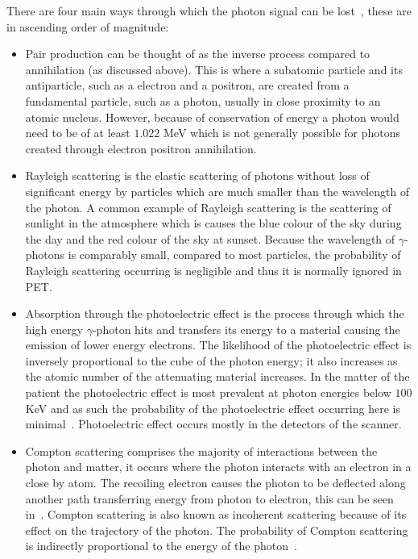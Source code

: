                There are four main ways through which the photon signal can be lost~, these are in ascending order of magnitude:
                
                \begin{itemize}
                    \item Pair production can be thought of as the inverse process compared to annihilation (as discussed above). This is where a subatomic particle and its antiparticle, such as a electron and a positron, are created from a fundamental particle, such as a photon, usually in close proximity to an atomic nucleus. However, because of conservation of energy a photon would need to be of at least $1.022$ \gls{MeV} which is not generally possible for photons created through electron positron annihilation.
                    
                    \item Rayleigh scattering is the elastic scattering of photons without loss of significant energy by particles which are much smaller than the wavelength of the photon. A common example of Rayleigh scattering is the scattering of sunlight in the atmosphere which is causes the blue colour of the sky during the day and the red colour of the sky at sunset. Because the wavelength of $\gamma$-photons is comparably small, compared to most particles, the probability of Rayleigh scattering occurring is negligible and thus it is normally ignored in \gls{PET}.
                    
                    \item Absorption through the photoelectric effect is the process through which the high energy $\gamma$-photon hits and transfers its energy to a material causing the emission of lower energy electrons. The likelihood of the photoelectric effect is inversely proportional to the cube of the photon energy; it also increases as the atomic number of the attenuating material increases. In the matter of the patient the photoelectric effect is most prevalent at photon energies below $100$ \gls{KeV} and as such the probability of the photoelectric effect occurring here is minimal~. Photoelectric effect occurs mostly in the detectors of the scanner.
                    
                    \item Compton scattering comprises the majority of interactions between the photon and matter, it occurs where the photon interacts with an electron in a close by atom. The recoiling electron causes the photon to be deflected along another path transferring energy from photon to electron, this can be seen in~. Compton scattering is also known as incoherent scattering because of its effect on the trajectory of the photon. The probability of Compton scattering is indirectly proportional to the energy of the photon~.
                \end{itemize}
                
